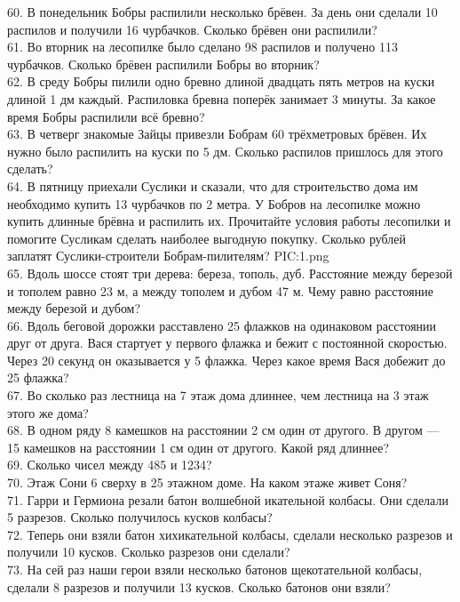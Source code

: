 60. В понедельник Бобры распилили несколько брёвен. За день они сделали 10 распилов и получили 16 чурбачков. Сколько брёвен они распилили?\\
61. Во вторник на лесопилке было сделано 98 распилов и получено 113 чурбачков. Сколько брёвен распилили Бобры во вторник?\\
62. В среду Бобры пилили одно бревно длиной двадцать пять метров на куски длиной 1 дм каждый. Распиловка бревна поперёк занимает 3 минуты. За какое время Бобры распилили всё бревно?\\
63. В четверг знакомые Зайцы привезли Бобрам 60 трёхметровых брёвен. Их нужно было распилить на куски по 5 дм. Сколько распилов пришлось для этого сделать?\\
64. В пятницу приехали Суслики и сказали, что для строительство дома им необходимо купить 13 чурбачков по 2 метра. У Бобров на лесопилке можно купить длинные брёвна и распилить их. Прочитайте условия работы лесопилки и помогите Сусликам сделать наиболее выгодную покупку. Сколько рублей заплатят Суслики-строители Бобрам-пилителям?
{{PIC:1.png}}\\
65. Вдоль шоссе стоят три дерева: береза, тополь, дуб. Расстояние между березой и тополем равно 23 м, а между тополем и дубом 47 м. Чему равно расстояние между березой и дубом?\\
66. Вдоль беговой дорожки расставлено 25 флажков на одинаковом расстоянии друг от друга. Вася стартует у первого флажка и бежит с постоянной скоростью. Через 20 секунд он оказывается у 5 флажка. Через какое время Вася добежит до 25 флажка?\\
67. Во сколько раз лестница на 7 этаж дома длиннее, чем лестница на 3 этаж этого же дома?\\
68. В одном ряду 8 камешков на расстоянии 2 см один от другого. В другом --- 15 камешков на расстоянии 1 см один от другого. Какой ряд длиннее?\\
69. Сколько чисел между 485 и  1234?\\
70. Этаж Сони 6 сверху в 25 этажном доме. На каком этаже живет Соня?\\
71. Гарри и Гермиона резали батон волшебной икательной колбасы. Они сделали 5 разрезов. Сколько получилось кусков колбасы?\\
72. Теперь они взяли батон хихикательной колбасы, сделали несколько разрезов и получили 10 кусков. Сколько разрезов они сделали?\\
73. На сей раз наши герои взяли несколько батонов щекотательной колбасы, сделали 8 разрезов и получили 13 кусков. Сколько батонов они взяли?\\
